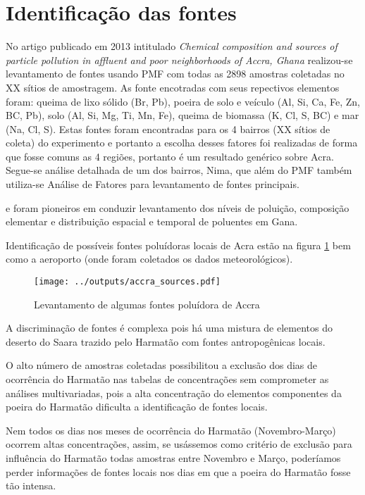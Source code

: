 \section{Identificação das fontes}

No artigo publicado em 2013 intitulado
\textit{Chemical composition and sources of particle pollution in affluent and
poor neighborhoods of Accra, Ghana} \citep{zhou2013} realizou-se levantamento de 
fontes usando PMF com todas as 2898 amostras coletadas no XX sítios de 
amostragem. As fonte encotradas com seus repectivos elementos foram: 
queima de lixo sólido (Br, Pb), poeira de solo e veículo (Al, Si, Ca, Fe, Zn, 
BC, Pb), solo (Al, Si, Mg, Ti, Mn, Fe), queima de biomassa (K, Cl, S, BC) e mar 
(Na, Cl, S). Estas fontes foram encontradas para os 4 bairros (XX sítios de 
coleta) do experimento e portanto a escolha desses fatores foi realizadas de 
forma que fosse comuns as 4 regiões, portanto é um resultado genérico sobre 
Acra. Segue-se análise detalhada de um dos bairros, Nima, que além do PMF
também utiliza-se Análise de Fatores para levantamento de fontes principais. 

\citet{ARKU2008} e \citet{DIONISIO2010} foram pioneiros em conduzir  
levantamento dos níveis de poluição, composição elementar e 
distribuição espacial e temporal de poluentes em Gana.

Identificação de possíveis fontes poluídoras locais de Acra estão na figura 
\ref{fg:acrasources} bem como a aeroporto
(onde foram coletados os dados meteorológicos).

\begin{figure}[H]
  \centering
  \texttt{[image: ../outputs/accra\_sources.pdf]}
  \caption{Levantamento de algumas fontes poluídora de Accra \label{fg:acrasources}}
\end{figure}

A discriminação de fontes é complexa pois há uma mistura de elementos do 
deserto do Saara trazido pelo Harmatão com fontes antropogênicas locais.

O alto número de amostras coletadas possibilitou a exclusão dos dias de 
ocorrência do Harmatão nas tabelas de concentrações sem comprometer as análises
multivariadas, pois a alta concentração do elementos componentes da poeira 
do Harmatão dificulta a identificação de fontes locais.

Nem todos os dias nos meses de ocorrência do Harmatão (Novembro-Março) 
ocorrem altas concentrações, assim, se usássemos como critério de exclusão para 
influência do Harmatão todas amostras entre Novembro e Março, poderíamos
perder informações de fontes locais nos dias em que a poeira do Harmatão fosse
tão intensa. 

